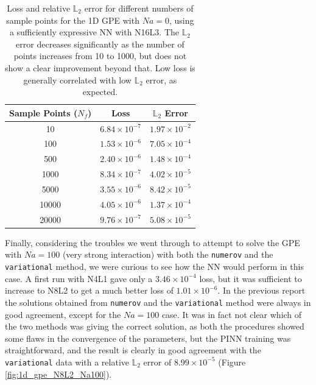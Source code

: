 \documentclass[a4paper, titlepage]{article}
\begin{document}
\begin{table}[h!]
    \centering
    \begin{tabular}{ccc}
        \toprule
        \textbf{Sample Points ($N_f$)} & \textbf{Loss} & \textbf{$\mathbb{L}_2$ Error} \\
        \midrule
        10      & $6.84 \times 10^{-7}$ & $1.97 \times 10^{-2}$ \\
        100     & $1.53 \times 10^{-6}$ & $7.05 \times 10^{-4}$ \\
        500     & $2.40 \times 10^{-6}$ & $1.48 \times 10^{-4}$ \\
        1000    & $8.34 \times 10^{-7}$ & $4.02 \times 10^{-5}$ \\
        5000    & $3.55 \times 10^{-6}$ & $8.42 \times 10^{-5}$ \\
        10000   & $4.05 \times 10^{-6}$ & $1.37 \times 10^{-4}$ \\
        20000   & $9.76 \times 10^{-7}$ & $5.08 \times 10^{-5}$ \\
        \bottomrule
    \end{tabular}
    \caption{Loss and relative $\mathbb{L}_2$ error for different numbers of
    sample points for the 1D GPE with $Na = 0$, using a sufficiently expressive
    NN with N16L3.
    The $\mathbb{L}_2$ error decreases significantly as the number of points 
    increases from 10 to 1000, but does not show a clear improvement beyond that.
    Low loss is generally correlated with low $\mathbb{L}_2$ error, as expected.}
    \label{tab:1d_gpe_Npoints}
\end{table}

Finally, considering the troubles we went through to attempt to solve the GPE
with $Na = 100$ (very strong interaction) with both the \texttt{numerov} and 
the \texttt{variational} method, we were curious to see how the NN would perform 
in this case.
A first run with N4L1 gave only a $3.46 \times 10^{-4}$ loss, but it was
sufficient to increase to N8L2 to get a much better loss of
$1.01 \times 10^{-6}$.
In the previous report the solutions obtained from \texttt{numerov} and the 
\texttt{variational} method were always in good agreement, except for the 
$Na = 100$ case.
It was in fact not clear which of the two methods was giving the correct
solution, as both the procedures showed some flaws in the convergence of the 
parameters, but the PINN training was straightforward, and the result is clearly 
in good agreement with the \texttt{variational} data with a relative 
$\mathbb L_2$ error of $8.99 \times 10^{-5}$
(Figure \ref{fig:1d_gpe_N8L2_Na100}).
\end{document}
